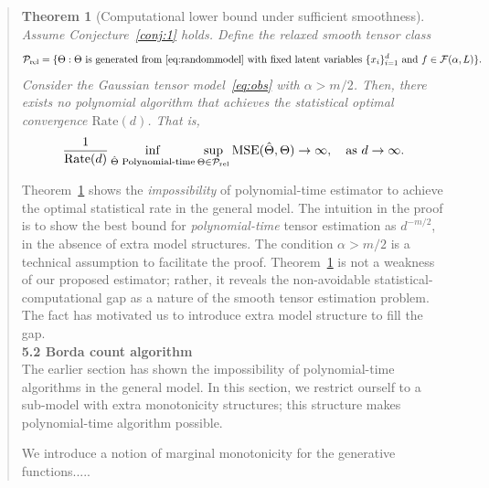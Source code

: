 \documentclass[11pt]{article}
\theoremstyle{plain}
\newtheorem{thm}{Theorem}[section]
\theoremstyle{definition}
\begin{document}
\begin{enumerate}[wide, labelwidth=!, labelindent=0pt]
\begin{quote}
{{\begin{thm}[Computational lower bound under sufficient smoothness]\label{thm:nopoly} Assume Conjecture~\ref{conj:1} holds. Define the relaxed smooth tensor class
\[
\mathcal{P}_{\textup{rel}}=\{\Theta: \Theta \text{ is generated from~\eqref{eq:randommodel} with fixed latent variables $\{x_i\}_{i=1}^d$ and $f\in \mathcal{F}(\alpha,L)$}\}.
\]
Consider the Gaussian tensor model~\eqref{eq:obs} with $\alpha> m/2$. Then, there exists no polynomial algorithm that achieves the statistical optimal convergence $\text{Rate}(d)$. That is, 
\begin{align}\label{eq:compthm}
\frac{1}{\textup{Rate}(d)}\inf_{\hat \Theta \textup{ Polynomial-time}}\sup_{\Theta\in\mathcal{P}_{\textup{rel}}}\textup{MSE}(\hat\Theta,\Theta)\rightarrow \infty, \quad \text{as}\ d\to\infty.
\end{align}
\end{thm}
Theorem~\ref{thm:nopoly} shows the \emph{impossibility} of polynomial-time estimator to achieve the optimal statistical rate in the general model. The intuition in the proof is to show the best bound for \emph{polynomial-time} tensor estimation as $d^{-m/2}$, in the absence of extra model structures. The condition $\alpha>m/2$ is a technical assumption to facilitate the proof. 
Theorem~\ref{thm:nopoly} is not a weakness of our proposed estimator; rather, it reveals the non-avoidable statistical-computational gap as a nature of the smooth tensor estimation problem. The fact has motivated us to introduce extra model structure to fill the gap.\\

{\bf 5.2 Borda count algorithm}\\

The earlier section has shown the impossibility of polynomial-time algorithms in the general model. In this section, we restrict ourself to a sub-model with extra monotonicity structures; this structure makes polynomial-time algorithm possible.} We introduce a notion of marginal monotonicity for the generative functions.....
}
\end{quote}


\end{enumerate}
\end{document}
